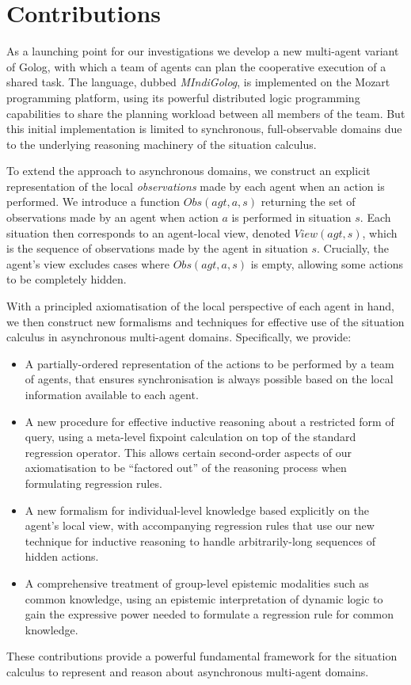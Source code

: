 \section{Contributions}

As a launching point for our investigations we develop a new multi-agent
variant of Golog, with which a team of agents can plan the cooperative
execution of a shared task. The language, dubbed \emph{MIndiGolog},
is implemented on the Mozart programming platform, using its powerful
distributed logic programming capabilities to share the planning workload
between all members of the team. But this initial implementation is
limited to synchronous, full-observable domains due to the underlying
reasoning machinery of the situation calculus.

To extend the approach to asynchronous domains, we construct an explicit
representation of the local \emph{observations} made by each agent
when an action is performed. We introduce a function $Obs(agt,a,s)$
returning the set of observations made by an agent when action $a$
is performed in situation $s$. Each situation then corresponds to
an agent-local view, denoted $View(agt,s)$, which is the sequence
of observations made by the agent in situation $s$. Crucially, the
agent's view excludes cases where $Obs(agt,a,s)$ is empty, allowing
some actions to be completely hidden.

With a principled axiomatisation of the local perspective of each
agent in hand, we then construct new formalisms and techniques for
effective use of the situation calculus in asynchronous multi-agent
domains. Specifically, we provide:

\begin{itemize}
\item A partially-ordered representation of the actions to be performed
by a team of agents, that ensures synchronisation is always possible
based on the local information available to each agent. 
\item A new procedure for effective inductive reasoning about a restricted
form of query, using a meta-level fixpoint calculation on top of the
standard regression operator. This allows certain second-order aspects
of our axiomatisation to be {}``factored out'' of the reasoning
process when formulating regression rules. 
\item A new formalism for individual-level knowledge based explicitly on
the agent's local view, with accompanying regression rules that use
our new technique for inductive reasoning to handle arbitrarily-long
sequences of hidden actions. 
\item A comprehensive treatment of group-level epistemic modalities such
as common knowledge, using an epistemic interpretation of dynamic
logic to gain the expressive power needed to formulate a regression
rule for common knowledge. 
\end{itemize}
These contributions provide a powerful fundamental framework for the
situation calculus to represent and reason about asynchronous multi-agent
domains.

